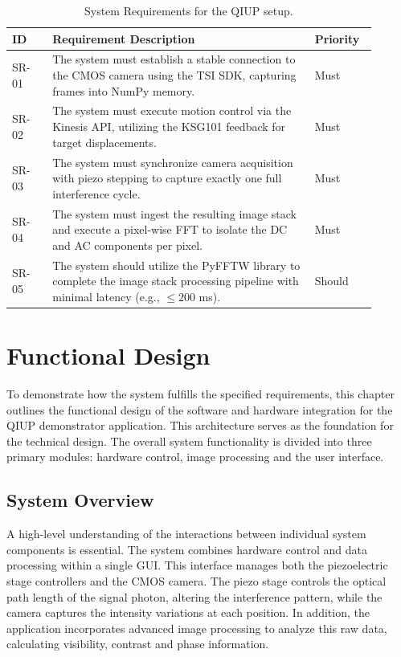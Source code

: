 \documentclass[12pt,a4paper]{article}
\begin{document}
    \begin{table}[H]
        \centering
        \renewcommand{\arraystretch}{1.3}
        \begin{tabular}{|p{0.1\linewidth}|p{0.65\linewidth}|p{0.15\linewidth}|}
            \hline
            \textbf{ID} & \textbf{Requirement Description} & \textbf{Priority} \\ \hline
            SR-01 & The system must establish a stable connection to the \ac{CMOS} camera using the \ac{TSI} \ac{SDK}, capturing frames into NumPy memory. & Must \\ \hline
            SR-02 & The system must execute motion control via the Kinesis API, utilizing the \ac{KSG101} feedback for target displacements. & Must \\ \hline
            SR-03 & The system must synchronize camera acquisition with piezo stepping to capture exactly one full interference cycle. & Must \\ \hline
            SR-04 & The system must ingest the resulting image stack and execute a pixel-wise \ac{FFT} to isolate the DC and AC components per pixel. & Must \\ \hline
            SR-05 & The system should utilize the PyFFTW library to complete the image stack processing pipeline with minimal latency (e.g., $\le 200$ ms). & Should \\ \hline
        \end{tabular}
        \caption{System Requirements for the QIUP setup.}
        \label{tab:system_requirements}
    \end{table}

\newpage

\section{Functional Design}
To demonstrate how the system fulfills the specified requirements, this chapter outlines the functional design of the software and hardware integration for the \ac{QIUP} demonstrator application. 
This architecture serves as the foundation for the technical design. The overall system functionality is divided into three primary modules: hardware control, image processing and the user interface. 

    \subsection{System Overview}
    A high-level understanding of the interactions between individual system components is essential. The system combines hardware control and data processing within a single \ac{GUI}. This interface manages both the piezoelectric stage controllers and the \ac{CMOS} camera. The piezo stage controls the optical path length of the signal photon, altering the interference pattern, while the camera captures the intensity variations at each position. In addition, the application incorporates advanced image processing to analyze this raw data, calculating visibility, contrast and phase information.
\end{document}
